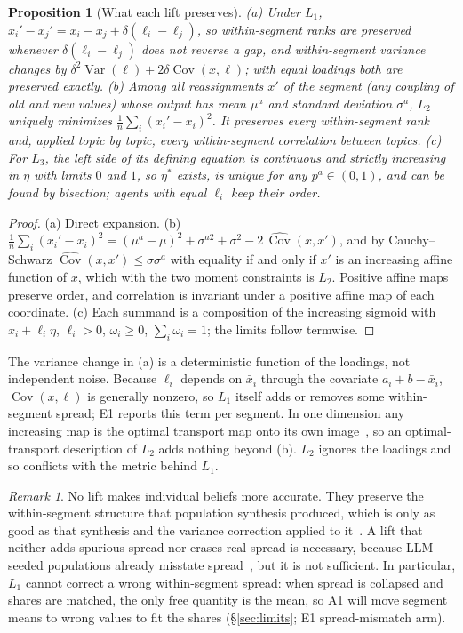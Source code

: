 \documentclass[10pt]{article}
\newtheorem{proposition}{Proposition}
\theoremstyle{remark}
\newtheorem{remark}{Remark}
\newcommand{\Var}{\operatorname{Var}}
\newcommand{\Cov}{\operatorname{Cov}}
\begin{document}
\begin{proposition}[What each lift preserves]
\label{prop:rank}
(a) Under $L_1$, $x_i'-x_j'=x_i-x_j+\delta(\ell_i-\ell_j)$, so within-segment ranks are preserved whenever $\delta(\ell_i-\ell_j)$ does not reverse a gap, and within-segment variance changes by $\delta^2\Var(\ell)+2\delta\Cov(x,\ell)$; with equal loadings both are preserved exactly. (b) Among all reassignments $x'$ of the segment (any coupling of old and new values) whose output has mean $\mu^a$ and standard deviation $\sigma^a$, $L_2$ uniquely minimizes $\frac1n\sum_i(x_i'-x_i)^2$. It preserves every within-segment rank and, applied topic by topic, every within-segment correlation between topics. (c) For $L_3$, the left side of its defining equation is continuous and strictly increasing in $\eta$ with limits $0$ and $1$, so $\eta^\ast$ exists, is unique for any $p^a\in(0,1)$, and can be found by bisection; agents with equal $\ell_i$ keep their order.
\end{proposition}
\begin{proof}
(a) Direct expansion. (b) $\frac1n\sum_i(x_i'-x_i)^2=(\mu^a-\mu)^2+\sigma^{a2}+\sigma^2-2\,\widehat{\Cov}(x,x')$, and by Cauchy--Schwarz $\widehat{\Cov}(x,x')\le\sigma\sigma^a$ with equality if and only if $x'$ is an increasing affine function of $x$, which with the two moment constraints is $L_2$. Positive affine maps preserve order, and correlation is invariant under a positive affine map of each coordinate. (c) Each summand is a composition of the increasing sigmoid with $x_i+\ell_i\eta$, $\ell_i>0$, $\omega_i\ge0$, $\sum_i\omega_i=1$; the limits follow termwise.
\end{proof}

The variance change in (a) is a deterministic function of the loadings, not independent noise. Because $\ell_i$ depends on $\bar x_i$ through the covariate $a_i+b-\bar x_i$, $\Cov(x,\ell)$ is generally nonzero, so $L_1$ itself adds or removes some within-segment spread; E1 reports this term per segment. In one dimension any increasing map is the optimal transport map onto its own image~\cite{peyre2019}, so an optimal-transport description of $L_2$ adds nothing beyond (b). $L_2$ ignores the loadings and so conflicts with the metric behind $L_1$.

\begin{remark}
No lift makes individual beliefs more accurate. They preserve the within-segment structure that population synthesis produced, which is only as good as that synthesis and the variance correction applied to it~\cite{rw_variance}. A lift that neither adds spurious spread nor erases real spread is necessary, because LLM-seeded populations already misstate spread~\cite{bisbee2024,ozkan2026,wang2024flatten}, but it is not sufficient. In particular, $L_1$ cannot correct a wrong within-segment spread: when spread is collapsed and shares are matched, the only free quantity is the mean, so A1 will move segment means to wrong values to fit the shares (\S\ref{sec:limits}; E1 spread-mismatch arm).
\end{remark}
\end{document}
